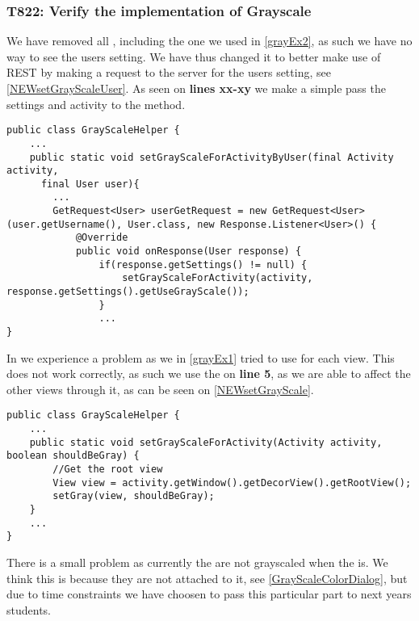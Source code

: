 \subsubsection{T822: Verify the implementation of Grayscale}
We have removed all , including the one we used in
\autoref{grayEx2}, as such we have no way to see the users setting. We have thus
changed it to better make use of REST by making a request to the server for the
users setting, see \autoref{NEWsetGrayScaleUser}. As seen on \textbf{lines
xx-xy} we make a simple  pass the settings and activity to the
 method.\nl

\begin{minipage}[H]{\linewidth}
\begin{lstlisting}[caption = Finds the grayscale setting for each user, label =
NEWsetGrayScaleUser] 
public class GrayScaleHelper {
	...
	public static void setGrayScaleForActivityByUser(final Activity activity, 
	  final User user){
		...
		GetRequest<User> userGetRequest = new GetRequest<User>(user.getUsername(), User.class, new Response.Listener<User>() {
            @Override
            public void onResponse(User response) {
           		if(response.getSettings() != null) {
               		setGrayScaleForActivity(activity, response.getSettings().getUseGrayScale());
               	}
	 			...
}
\end{lstlisting}
\end{minipage}

In  we experience a problem as we in
\autoref{grayEx1} tried to use  for each view. This does not work
correctly, as such we use the  on \textbf{line
5}, as we are able to affect the other views through it, as can be seen on
\autoref{NEWsetGrayScale}.

\begin{minipage}[H]{\linewidth}
\begin{lstlisting}[caption = The root View is used instead of all the seperate
views, label = NEWsetGrayScale] public class GrayScaleHelper {
	...
    public static void setGrayScaleForActivity(Activity activity, boolean shouldBeGray) {
        //Get the root view
        View view = activity.getWindow().getDecorView().getRootView();
        setGray(view, shouldBeGray);
    }
    ...
}
\end{lstlisting}
\end{minipage}

There is a small problem as currently the  are not grayscaled
when the  is. We think this is because they are not attached to
it, see \autoref{GrayScaleColorDialog}, but due to time constraints we have
choosen to pass this particular part to next years students. 

